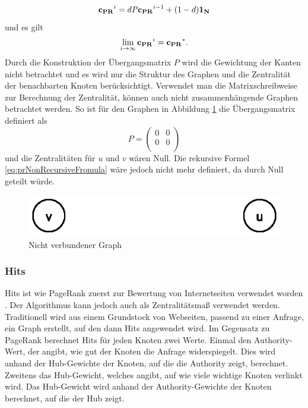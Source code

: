 \[
\mathbf{c_{PR}}^{i} = d\mathit{P}\mathbf{c_{PR}}^{i-1} + (1-d)\mathbf{1_N}
\]
und es gilt 
\[
\lim_{i \rightarrow \infty} \mathbf{c_{PR}}^i = \mathbf{c_{PR}}^* \text{.}
\]
Durch die Konstruktion der Übergangsmatrix $\mathit{P}$ wird die Gewichtung der Kanten nicht betrachtet und es wird nur die Struktur des Graphen und die Zentralität der benachbarten Knoten berücksichtigt. Verwendet man die Matrixschreibweise zur Berechnung der Zentralität, können auch nicht zusammenhängende Graphen betrachtet werden. So ist für den Graphen in Abbildung \ref{fig:disconnectedGrapPR} die Übergangsmatrix definiert als 
\[
\mathit{P} = 
\left(
\begin{array}{cc}
0 & 0 \\
0 & 0 \\
\end{array}
\right)
\]
und die Zentralitäten für $u$ und $v$ wären Null. Die rekursive Formel \ref{eq:prNonRecursiveFromula} wäre jedoch nicht mehr definiert, da durch Null geteilt würde.

\begin{figure}
\centering
\includegraphics[scale=1]{images/content/02_fundamentals/disconnectedGraphPR} 
\caption{Nicht verbundener Graph}
\label{fig:disconnectedGrapPR}
\end{figure}

\subsubsection{Hits}
Hits ist wie PageRank zuerst zur Bewertung von Internetseiten verwendet worden \citep{hits}. Der Algorithmus kann jedoch auch als Zentralitätsmaß verwendet werden. Traditionell wird aus einem Grundstock von Webseiten, passend zu einer Anfrage, ein Graph erstellt, auf den dann Hits angewendet wird. Im Gegensatz zu PageRank berechnet Hits für jeden Knoten zwei Werte. Einmal den Authority-Wert, der angibt, wie gut der Knoten die Anfrage widerspiegelt. Dies wird anhand der Hub-Gewichte der Knoten, auf die die Authority zeigt, berechnet. Zweitens das Hub-Gewicht, welches angibt, auf wie viele wichtige Knoten verlinkt wird. Das Hub-Gewicht wird anhand der Authority-Gewichte der Knoten berechnet, auf die der Hub zeigt.

